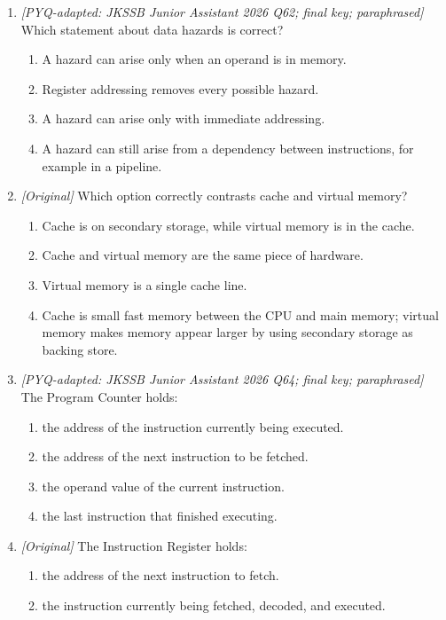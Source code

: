 \begin{enumerate}[label=\textbf{Q\arabic*.}, leftmargin=*]
\begin{enumerate}[label=\Alph*.]
  \end{enumerate}
\item \textit{[PYQ-adapted: JKSSB Junior Assistant 2026 Q62; final key;
paraphrased]} Which statement about data hazards is correct?
  \begin{enumerate}[label=\Alph*.]
    \item A hazard can arise only when an operand is in memory.
    \item Register addressing removes every possible hazard.
    \item A hazard can arise only with immediate addressing.
    \item A hazard can still arise from a dependency between instructions,
      for example in a pipeline.
  \end{enumerate}
\item \textit{[Original]} Which option correctly contrasts cache and virtual
memory?
  \begin{enumerate}[label=\Alph*.]
    \item Cache is on secondary storage, while virtual memory is in the
      cache.
    \item Cache and virtual memory are the same piece of hardware.
    \item Virtual memory is a single cache line.
    \item Cache is small fast memory between the CPU and main memory;
      virtual memory makes memory appear larger by using secondary storage as
      backing store.
  \end{enumerate}
\item \textit{[PYQ-adapted: JKSSB Junior Assistant 2026 Q64; final key;
paraphrased]} The Program Counter holds:
  \begin{enumerate}[label=\Alph*.]
    \item the address of the instruction currently being executed.
    \item the address of the next instruction to be fetched.
    \item the operand value of the current instruction.
    \item the last instruction that finished executing.
  \end{enumerate}
\item \textit{[Original]} The Instruction Register holds:
  \begin{enumerate}[label=\Alph*.]
    \item the address of the next instruction to fetch.
    \item the instruction currently being fetched, decoded, and executed.

\end{enumerate}
\end{enumerate}
